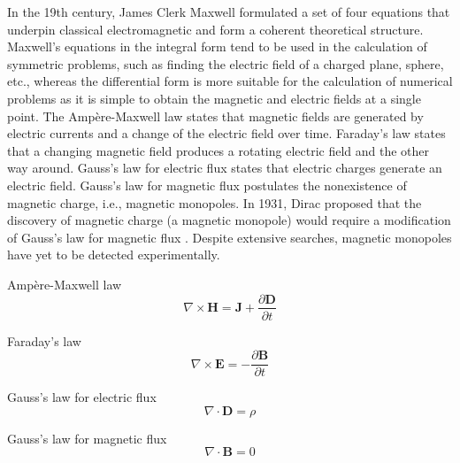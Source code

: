 In the 19th century, James Clerk Maxwell formulated a set of four equations that underpin classical electromagnetic and form a coherent theoretical structure. 
Maxwell's equations in the integral form tend to be used in the calculation of symmetric problems, such as finding the electric field of a charged plane, sphere, etc., whereas the differential form is more suitable for the calculation of numerical problems as it is simple to obtain the magnetic and electric fields at a single point. The Ampère-Maxwell law states that magnetic fields are generated by electric currents and a change of the electric field over time. Faraday's law states that a changing magnetic field produces a rotating electric field and the other way around. Gauss's law for electric flux states that electric charges generate an electric field. Gauss's law for magnetic flux postulates the nonexistence of magnetic charge, i.e., magnetic monopoles. In 1931, Dirac proposed that the discovery of magnetic charge (a magnetic monopole) would require a modification of Gauss's law for magnetic flux \cite{dirac1931monopole}.  Despite extensive searches, magnetic monopoles have yet to be detected experimentally. 


Ampère-Maxwell law
\begin{equation}
\nabla \times \mathbf{H} =\mathbf{J} + \frac{\partial \mathbf{D}}{\partial t}
\end{equation}

Faraday’s law
\begin{equation}
\nabla \times \mathbf{E} = - \frac{\partial \mathbf{B}}{\partial t}
\end{equation}

Gauss's law for electric flux
\begin{equation}
\nabla \cdot \mathbf{D} = \rho
\end{equation}

Gauss's law for magnetic flux
\begin{equation}
\nabla \cdot \mathbf{B} = 0
\end{equation}




